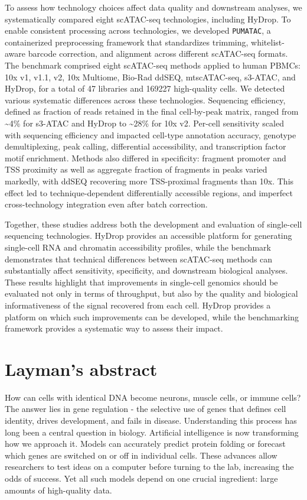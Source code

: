 To assess how technology choices affect data quality and downstream analyses, we systematically compared eight scATAC-seq technologies, including HyDrop. To enable consistent processing across technologies, we developed \texttt{PUMATAC}, a containerized preprocessing framework that standardizes trimming, whitelist-aware barcode correction, and alignment across different scATAC-seq formats. The benchmark comprised eight scATAC-seq methods applied to human PBMCs: 10x v1, v1.1, v2, 10x Multiome, Bio-Rad ddSEQ, mtscATAC-seq, s3-ATAC, and HyDrop, for a total of \num{47} libraries and \num{169227} high-quality cells. We detected various systematic differences across these technologies. Sequencing efficiency, defined as fraction of reads retained in the final cell-by-peak matrix, ranged from \textasciitilde\num{4}\% for s3-ATAC and HyDrop to \textasciitilde\num{28}\% for 10x v2. Per-cell sensitivity scaled with sequencing efficiency and impacted cell-type annotation accuracy, genotype demultiplexing, peak calling, differential accessibility, and transcription factor motif enrichment. Methods also differed in specificity: fragment promoter and TSS proximity as well as aggregate fraction of fragments in peaks varied markedly, with ddSEQ recovering more TSS-proximal fragments than 10x. This effect led to technique-dependent differentially accessible regions, and imperfect cross-technology integration even after batch correction.

Together, these studies address both the development and evaluation of single-cell sequencing technologies. HyDrop provides an accessible platform for generating single-cell RNA and chromatin accessibility profiles, while the benchmark demonstrates that technical differences between scATAC-seq methods can substantially affect sensitivity, specificity, and downstream biological analyses. These results highlight that improvements in single-cell genomics should be evaluated not only in terms of throughput, but also by the quality and biological informativeness of the signal recovered from each cell. HyDrop provides a platform on which such improvements can be developed, while the benchmarking framework provides a systematic way to assess their impact.

\chapter*{Layman's abstract}
How can cells with identical DNA become neurons, muscle cells, or immune cells? The answer lies in gene regulation - the selective use of genes that defines cell identity, drives development, and fails in disease. Understanding this process has long been a central question in biology. Artificial intelligence is now transforming how we approach it. Models can accurately predict protein folding or forecast which genes are switched on or off in individual cells. These advances allow researchers to test ideas on a computer before turning to the lab, increasing the odds of success. Yet all such models depend on one crucial ingredient: large amounts of high-quality data.

